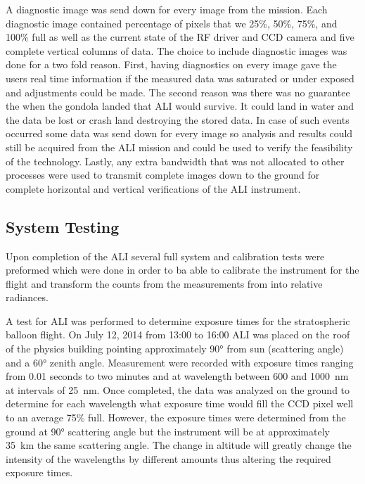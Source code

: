 A diagnostic image was send down for every image from the mission. Each diagnostic image contained percentage of pixels that we 25\%, 50\%, 75\%, and 100\% full as well as the current state of the RF driver and CCD camera and five complete vertical columns of data. The choice to include diagnostic images was done for a two fold reason. First, having diagnostics on every image gave the users real time information if the measured data was saturated or under exposed and adjustments could be made. The second reason was there was no guarantee the when the gondola landed that ALI would survive. It could land in water and the data be lost or crash land destroying the stored data. In case of such events occurred some data was send down for every image so analysis and results could still be acquired from the ALI mission and could be used to verify the feasibility of the technology. Lastly, any extra bandwidth that was not allocated to other processes were used to transmit complete images down to the ground for complete horizontal and vertical verifications of the ALI instrument.

\subsection{System Testing}

Upon completion of the ALI several full system and calibration tests were preformed which were done in order to ba able to calibrate the instrument for the flight and transform the counts from the measurements from into relative radiances.

A test for ALI was performed to determine exposure times for the stratospheric balloon flight. On July 12, 2014 from 13:00 to 16:00 ALI was placed on the roof of the physics building pointing approximately 90\si{\degree} from sun (scattering angle) and a 60\si{\degree} zenith angle. Measurement were recorded with exposure times ranging from 0.01 seconds to two minutes and at wavelength between 600 and 1000~nm at intervals of 25~nm. Once completed, the data was analyzed on the ground to determine for each wavelength what exposure time would fill the CCD pixel well to an average 75\% full. However, the exposure times were determined from the ground at 90\si{\degree} scattering angle but the instrument will be at approximately 35~km the same scattering angle. The change in altitude will greatly change the intensity of the wavelengths by different amounts thus altering the required exposure times.

